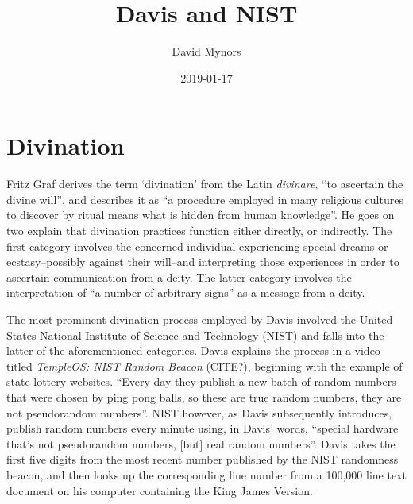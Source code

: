 \documentclass{article}
\author{David Mynors}
\title{Davis and NIST}
\date{2019-01-17}
\begin{document}
\section*{Divination}

Fritz Graf \parencite{Divination11} derives the term `divination'
from the Latin \textit{divinare}, ``to ascertain the divine will'',
and describes it as ``a procedure employed in many religious cultures
to discover by ritual means what is hidden from human knowledge''.
He goes on two explain that divination practices function
either directly, or indirectly.
The first category involves the concerned individual experiencing
special dreams or ecstasy--possibly against their will--and interpreting
those experiences in order to ascertain communication from a deity.
The latter category involves the interpretation of
``a number of arbitrary signs'' as a message from a deity.

The most prominent divination process employed by Davis involved
the United States National Institute of Science and Technology (NIST)
and falls into the latter of the aforementioned categories.
Davis explains the process in a video titled
\textit{TempleOS: NIST Random Beacon} (CITE?),
beginning with the example of state lottery websites.
``Every day they publish a new batch of random numbers
that were chosen by ping pong balls, so these are true random numbers,
they are not pseudorandom numbers''.
NIST however, as Davis subsequently introduces,
publish random numbers every minute using, in Davis' words,
``special hardware that's not pseudorandom numbers, [but] real random numbers''.
Davis takes the first five digits from the most recent number
published by the NIST randomness beacon,
and then looks up the corresponding line number from
a 100,000 line text document on his computer containing the King James Version.

\clearpage
\printbibliography
\end{document}
